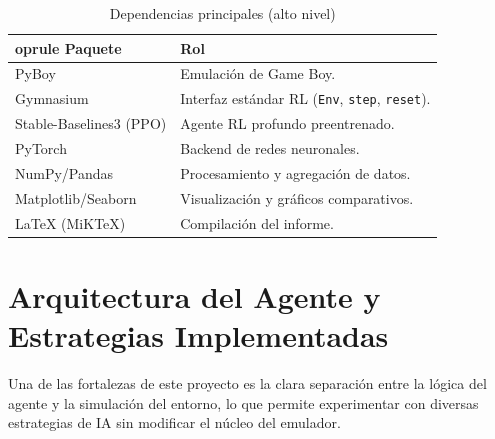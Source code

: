 \documentclass[12pt, oneside, openany]{book}
\begin{document}
\begin{table}[H]
    \centering
    \caption{Dependencias principales (alto nivel)}
    \label{tab:deps}
    \begin{tabular}{@{}ll@{}}
        	oprule
        Paquete & Rol \\
        \midrule
        PyBoy & Emulación de Game Boy. \\
        Gymnasium & Interfaz estándar RL (\texttt{Env}, \texttt{step}, \texttt{reset}). \\
        Stable-Baselines3 (PPO) & Agente RL profundo preentrenado. \\
        PyTorch & Backend de redes neuronales. \\
        NumPy/Pandas & Procesamiento y agregación de datos. \\
        Matplotlib/Seaborn & Visualización y gráficos comparativos. \\
        \LaTeX{} (MiKTeX) & Compilación del informe. \\
        \bottomrule
    \end{tabular}
\end{table}

\section{Arquitectura del Agente y Estrategias Implementadas}
\label{sec:arquitectura_agentes}

Una de las fortalezas de este proyecto es la clara separación entre la lógica del agente y la simulación del entorno, lo que permite experimentar con diversas estrategias de IA sin modificar el núcleo del emulador.
\end{document}

